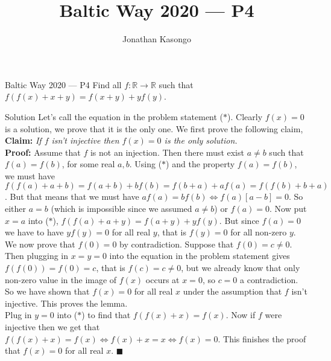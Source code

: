 \documentclass{article}
\author{Jonathan Kasongo}
\title{Baltic Way 2020 --- P4}
\begin{document}
\maketitle

\begin{problem}{Baltic Way 2020 --- P4}
Find all $f : \mathbb{R} \rightarrow \mathbb{R}$ such that
$f(f(x) + x + y) = f(x + y) + yf(y)$.
\end{problem}

\begin{solution}{Solution}
Let's call the equation in the problem statement ($*$).
Clearly $f(x) = 0$ is a solution, we prove that it is the only
one. We first prove the following claim,\\

{\sffamily \bfseries Claim:} \textit{If $f$ isn't injective then $f(x) = 0$ is the only solution.}\\

{\sffamily \bfseries Proof:} Assume that $f$ is not an injection. Then
there must exist $a \neq b$ such that $f(a)=f(b)$, for some real $a, b$.
Using ($*$) and the property $f(a)=f(b)$,
we must have
$f(f(a) + a + b) = f(a + b) + bf(b) = f(b + a) + af(a) = f(f(b) + b + a)$.
But that means that we must have $af(a) = bf(b) \iff f(a)[a-b] = 0$. So
either $a = b$ (which is impossible since we assumed $a\neq b$) or
$f(a) = 0$. Now put $x = a$ into ($*$),
$f(f(a) + a + y) = f(a + y) + yf(y)$. But since $f(a) = 0$ we have to
have $yf(y) = 0$ for all real $y$, that is $f(y) = 0$ for all non-zero $y$.
We now prove that $f(0) = 0$ by contradiction. Suppose that
$f(0) = c \neq 0$. Then plugging in $x = y = 0$ into the equation in the
problem statement gives $f(f(0)) = f(0) = c$, that is $f(c) = c \neq 0$,
but we already know that only non-zero value in the image of $f(x)$ occurs
at $x = 0$, so $c=0$ a contradiction. So we have shown that $f(x) = 0$ for
all real $x$ under the assumption that $f$ isn't injective. This proves
the lemma.\\

Plug in $y = 0$ into ($*$) to find that $f(f(x) + x) = f(x)$.
Now if $f$ were injective then we get that
$f(f(x) + x) = f(x) \iff f(x) + x = x \iff f(x) = 0$. This finishes the
proof that $f(x) = 0$ for all real $x$. $\blacksquare$
\end{solution}
\end{document}
